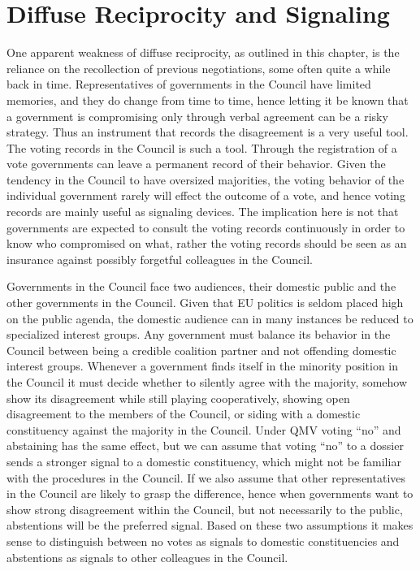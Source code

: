 \section{Diffuse Reciprocity and Signaling}

One apparent weakness of diffuse reciprocity, as outlined in this chapter, is the reliance on the recollection of previous negotiations, some often quite a while back in time. Representatives of governments in the Council have limited memories, and they do change from time to time, hence letting it be known that a government is compromising only through verbal agreement can be a risky strategy. Thus an instrument that records the disagreement is a very useful tool. The voting records in the Council is such a tool. Through the registration of a vote governments can leave a permanent record of their behavior. Given the tendency in the Council to have oversized majorities, the voting behavior of the individual government rarely will effect the outcome of a vote, and hence voting records are mainly useful as signaling devices. The implication here is not that governments are expected to consult the voting records continuously in order to know who compromised on what, rather the voting records should be seen as an insurance against possibly forgetful colleagues in the Council. 

Governments in the Council face two audiences, their domestic public and the other governments in the Council. Given that EU politics is seldom placed high on the public agenda, the domestic audience can in many instances be reduced to specialized interest groups. Any government must balance its behavior in the Council between being a credible coalition partner and not offending domestic interest groups. Whenever a government finds itself in the minority position in the Council it must decide whether to silently agree with the majority, somehow show its disagreement while still playing cooperatively, showing open disagreement to the members of the Council, or siding with a domestic constituency against the majority in the Council. Under QMV voting ``no'' and abstaining has the same effect, but we can assume that voting ``no'' to a dossier sends a stronger signal to a domestic constituency, which might not be familiar with the procedures in the Council. If we also assume that other representatives in the Council are likely to grasp the difference, hence when governments want to show strong disagreement within the Council, but not necessarily to the public, abstentions will be the preferred signal. Based on these two assumptions it makes sense to distinguish between no votes as signals to domestic constituencies and abstentions as signals to other colleagues in the Council. 

